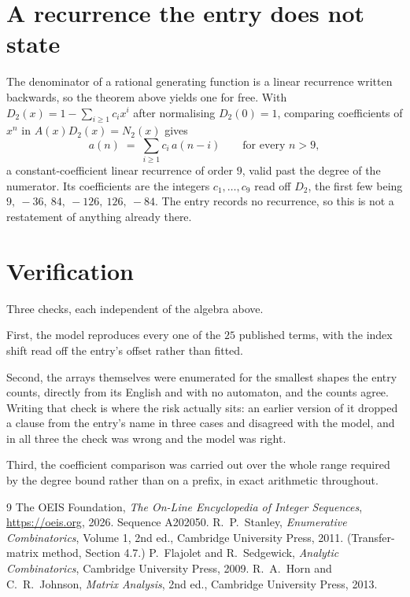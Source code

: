\documentclass[11pt,a4paper]{article}
\theoremstyle{plain}
\theoremstyle{definition}
\begin{document}
\section{A recurrence the entry does not state}

The denominator of a rational generating function is a linear recurrence written backwards, so
the theorem above yields one for free. With $D_2(x)=1-\sum_{i\ge1}c_ix^i$ after normalising
$D_2(0)=1$, comparing coefficients of $x^n$ in $A(x)D_2(x)=N_2(x)$ gives
\[
a(n)\;=\;\sum_{i\ge1}c_i\,a(n-i)\qquad\text{for every }n>9,
\]
a constant-coefficient linear recurrence of order $9$, valid past the degree of the
numerator. Its coefficients are the integers $c_1,\dots,c_{9}$ read off $D_2$, the first few being $9,\ -36,\ 84,\ -126,\ 126,\ -84$. The entry records no recurrence, so this is not a restatement of anything
already there.

\section{Verification}

Three checks, each independent of the algebra above.

First, the model reproduces every one of the $25$ published terms, with the index shift
read off the entry's offset rather than fitted.

Second, the arrays themselves were enumerated for the smallest shapes the entry counts,
directly from its English and with no automaton, and the counts agree. Writing that check is
where the risk actually sits: an earlier version of it dropped a clause from the entry's name
in three cases and disagreed with the model, and in all three the check was wrong and the model
was right.

Third, the coefficient comparison was carried out over the whole range required by the degree
bound rather than on a prefix, in exact arithmetic throughout.

\begin{thebibliography}{9}
 The OEIS Foundation, \emph{The On-Line Encyclopedia of Integer
Sequences}, \url{https://oeis.org}, 2026. Sequence A202050.
 R.~P.~Stanley, \emph{Enumerative Combinatorics}, Volume 1, 2nd ed.,
Cambridge University Press, 2011. (Transfer-matrix method, Section 4.7.)
 P.~Flajolet and R.~Sedgewick, \emph{Analytic Combinatorics}, Cambridge
University Press, 2009.
 R.~A.~Horn and C.~R.~Johnson, \emph{Matrix Analysis}, 2nd ed., Cambridge
University Press, 2013.
\end{thebibliography}
\end{document}
